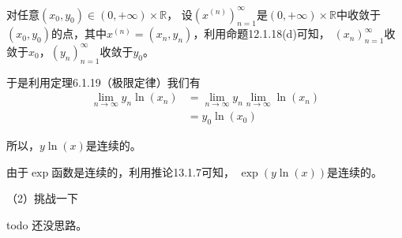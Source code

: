 \documentclass{article}
\begin{document}
对任意$(x_0, y_0) \in (0, + \infty) \times \mathbb{R}$，
设$(x^{(n)})_{n = 1}^\infty$是$(0, + \infty) \times \mathbb{R}$中收敛于
$(x_0, y_0)$的点，其中$x^{(n)} = (x_n, y_n)$，利用命题12.1.18(d)可知，
$(x_n)_{n = 1}^\infty$收敛于$x_0$，$(y_n)_{n = 1}^\infty$收敛于$y_0$。

于是利用定理6.1.19（极限定律）我们有
\begin{align*}
  \lim\limits_{n \to \infty} y_n \ln(x_n)
   & = \lim\limits_{n \to \infty} y_n \lim\limits_{n \to \infty} \ln(x_n) \\
   & = y_0 \ln(x_0)
\end{align*}

所以，$y\ln(x)$是连续的。

由于$\exp$函数是连续的，利用推论13.1.7可知，
$\exp(y\ln(x))$是连续的。

（2）挑战一下

todo 还没思路。
\end{document}
